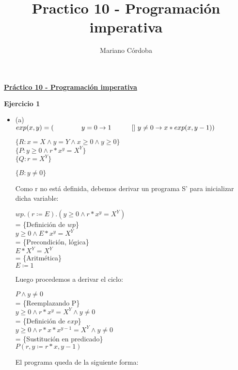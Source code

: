 \documentclass[12pt]{article}
\title{Practico 10 - Programación imperativa}
\author{Mariano Córdoba}
\begin{document}
\begin{center}
\large \underline{\textbf{Práctico 10 - Programación imperativa}}
\end{center}

\textbf{Ejercicio 1}

\begin{itemize}
    \item (a)\\
            $exp(x, y) = (\\
            \hspace*{41pt}y = 0 \rightarrow 1\\
            \hspace*{30pt}[]~ y \neq 0 \rightarrow x * exp(x, y - 1)\\
            )$

    $\{R: x = X \land y = Y \land x \ge 0 \land y \ge 0\}$\\
    $\{P: y \ge 0 \land r * x^y = X^Y\}$\\
    $\{Q: r = X^Y\}$

    $\{B: y \neq 0\}$
 
    \bigbreak

    Como r no está definida, debemos derivar un programa S' para inicializar dicha variable:

    $wp.(r \coloneqq E).(y \ge 0 \land r * x^y = X^Y)$\\
    = \{Definición de $wp$\}\\
    $y \ge 0 \land E * x^y = X^Y$\\
    = \{Precondición, lógica\}\\
    $E * X^Y = X^Y$\\
    = \{Aritmética\}\\
    $E \coloneqq 1$

    \bigbreak

    Luego procedemos a derivar el ciclo:

    $P \land y \neq 0$\\
    = \{Reemplazando P\}\\
    $y \ge 0 \land r * x^y = X^Y \land y \neq 0$\\
    = \{Definición de $exp$\}\\
    $y \ge 0 \land r * x * x^{y - 1} = X^Y \land y \neq 0$\\
    = \{Sustitución en predicado\}\\
    $P(r, y \coloneqq r * x, y - 1)$

    \bigbreak

    El programa queda de la siguiente forma:


\end{itemize}
\end{document}
